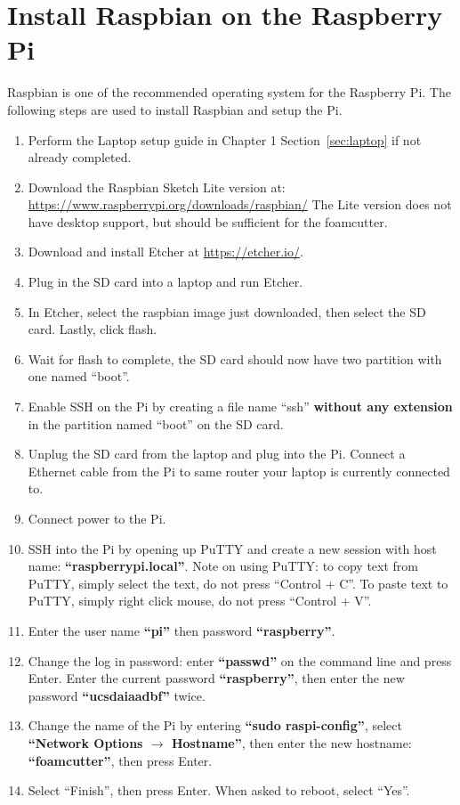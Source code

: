 \documentclass[titlepage,12pt,letter]{report}
\numberwithin{equation}{chapter}
\begin{document}
\section{Install Raspbian on the Raspberry Pi}
Raspbian is one of the recommended operating system for the Raspberry Pi. The following steps are used to install Raspbian and setup the Pi.

\begin{enumerate}[noitemsep,topsep=0pt]
	\item Perform the Laptop setup guide in Chapter 1 Section~\ref{sec:laptop} if not already completed.
	\item Download the Raspbian Sketch Lite version at: \\ \href{https://www.raspberrypi.org/downloads/raspbian/}{https://www.raspberrypi.org/downloads/raspbian/} The Lite version does not have desktop support, but should be sufficient for the foamcutter.
	\item Download and install Etcher at \href{https://etcher.io/}{https://etcher.io/}.
	\item Plug in the SD card into a laptop and run Etcher.
	\item In Etcher, select the raspbian image just downloaded, then select the SD card. Lastly, click flash.
	\item Wait for flash to complete, the SD card should now have two partition with one named ``boot''.
	\item Enable SSH on the Pi by creating a file name ``ssh'' \textbf{without any extension} in the partition named ``boot'' on the SD card.
	\item Unplug the SD card from the laptop and plug into the Pi. Connect a Ethernet cable from the Pi to same router your laptop is currently connected to.
	\item Connect power to the Pi.
	\item SSH into the Pi by opening up PuTTY and create a new session with host name: \textbf{``raspberrypi.local''}. Note on using PuTTY: to copy text from PuTTY, simply select the text, do not press ``Control + C''. To paste text to PuTTY, simply right click mouse, do not press ``Control + V''.
	\item Enter the user name \textbf{``pi''} then password \textbf{``raspberry''}.
	\item Change the log in password: enter \textbf{``passwd''} on the command line and press Enter. Enter the current password \textbf{``raspberry''}, then enter the new password \textbf{``ucsdaiaadbf''} twice.
	\item Change the name of the Pi by entering \textbf{``sudo raspi-config''}, select \textbf{``Network Options $\rightarrow$ Hostname''}, then enter the new hostname: \textbf{``foamcutter''}, then press Enter.
	\item Select ``Finish'', then press Enter. When asked to reboot, select ``Yes''.
\end{enumerate}
\end{document}
